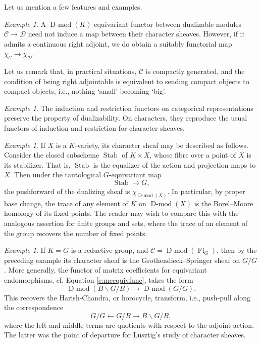 \documentclass[10pt]{amsart}
\newcommand{\sB}{\on{Fl}_G}
\newcommand{\on}{\operatorname}
\newcommand{\Dmod}{\on{D-mod}}
\theoremstyle{remark}
\newtheorem{ex}[subsubsection]{Example}
\newcommand{\sD}{\mathscr{D}}
\numberwithin{equation}{section}
\newcommand{\sC}{\mathscr{C}}
\begin{document}
\subsubsection{}Let us mention a few features and examples. 

\begin{ex} A $\Dmod(K)$ equivariant functor between dualizable modules 
$\sC \rightarrow \sD$ 
need not induce a map between their character sheaves. However, if it admits 
a continuous right adjoint, we do obtain a suitably functorial map $\chi_\sC 
\rightarrow 
\chi_{\sD}$. 
	
	Let us remark that, in practical situations, $\sC$ is compactly generated, 
	and the condition of being right adjointable is equivalent to sending 
	compact objects to compact objects, i.e., nothing `small' becoming `big'. 
	\end{ex}


\begin{ex} The induction and restriction functors on categorical 
representations preserve the property of dualizability.  On characters, they 
reproduce the usual functors of induction and restriction for character 
sheaves. 
\end{ex}


\begin{ex} If $X$ is a $K$-variety, its character sheaf may be described as 
follows. Consider the 
closed subscheme $\on{Stab}$ 
of $K \times X$, whose fibre over a point of $X$ is its stabilizer. That is, 
$\on{Stab}$ is the 
equalizer of the action and 
projection maps to $X$. Then under the tautological $G$-equivariant map 
%
\[
\on{Stab} \rightarrow G,
\]
%	
the pushforward of the dualizing sheaf is $\chi_{\Dmod(X)}$. In particular, by 
proper base change, the 
trace of any element of $K$ on $\Dmod(X)$ is the Borel--Moore homology of its 
fixed points. The reader may wish to compare this with the analogous assertion for finite groups and 
sets, where the trace of an element of the group recovers the number of fixed points. 
\end{ex}



\begin{ex} If $K=G$ is a reductive group, and $\sC = \Dmod(\sB)$, then by the 
preceding example its 
character sheaf is the Grothendieck--Springer sheaf on $G/G$. More generally, 
the functor of matrix coefficients for equivariant endomorphisms, cf. Equation 
\eqref{e:mcequivfunc}, takes the form
%
\[  \Dmod(B \backslash G / B) \rightarrow \Dmod(G/G).\]
%
This recovers the Harish-Chandra, or horocycle, transform, i.e., push-pull along 
the correspondence $$G/G \leftarrow G/B \rightarrow B \backslash G / B,$$ where 
the left and middle terms are quotients with respect to the adjoint action. The 
latter was the point of departure for Lusztig's study of character sheaves. 
\end{ex}
\end{document}
